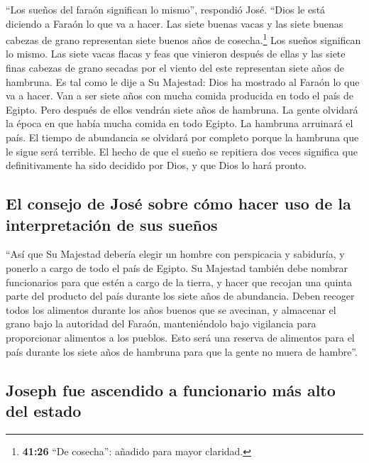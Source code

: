  ``Los sueños del faraón significan lo mismo'', respondió
José. ``Dios le está diciendo a Faraón lo que va a hacer.
 Las siete buenas vacas y las siete buenas cabezas de
grano representan siete buenos años de cosecha.\footnote{\textbf{41:26}
  ``De cosecha'': añadido para mayor claridad.} Los sueños significan lo
mismo.  Las siete vacas flacas y feas que vinieron
después de ellas y las siete finas cabezas de grano secadas por el
viento del este representan siete años de hambruna.  Es
tal como le dije a Su Majestad: Dios ha mostrado al Faraón lo que va a
hacer.  Van a ser siete años con mucha comida producida
en todo el país de Egipto.  Pero después de ellos vendrán
siete años de hambruna. La gente olvidará la época en que había mucha
comida en todo Egipto. La hambruna arruinará el país.  El
tiempo de abundancia se olvidará por completo porque la hambruna que le
sigue será terrible.  El hecho de que el sueño se
repitiera dos veces significa que definitivamente ha sido decidido por
Dios, y que Dios lo hará pronto.

\hypertarget{el-consejo-de-josuxe9-sobre-cuxf3mo-hacer-uso-de-la-interpretaciuxf3n-de-sus-sueuxf1os}{%
\subsection{El consejo de José sobre cómo hacer uso de la interpretación
de sus
sueños}\label{el-consejo-de-josuxe9-sobre-cuxf3mo-hacer-uso-de-la-interpretaciuxf3n-de-sus-sueuxf1os}}

 ``Así que Su Majestad debería elegir un hombre con
perspicacia y sabiduría, y ponerlo a cargo de todo el país de Egipto.
 Su Majestad también debe nombrar funcionarios para que
estén a cargo de la tierra, y hacer que recojan una quinta parte del
producto del país durante los siete años de abundancia. 
Deben recoger todos los alimentos durante los años buenos que se
avecinan, y almacenar el grano bajo la autoridad del Faraón,
manteniéndolo bajo vigilancia para proporcionar alimentos a los pueblos.
 Esto será una reserva de alimentos para el país durante
los siete años de hambruna para que la gente no muera de hambre''.

\hypertarget{joseph-fue-ascendido-a-funcionario-muxe1s-alto-del-estado}{%
\subsection{Joseph fue ascendido a funcionario más alto del
estado}\label{joseph-fue-ascendido-a-funcionario-muxe1s-alto-del-estado}}

